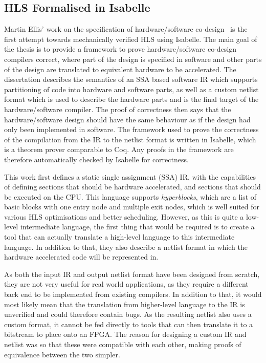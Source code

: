 \subsection{HLS Formalised in Isabelle}

Martin Ellis' work on the specification of hardware/software
co-design~\cite{ellis08_csicgfu} is the first attempt towards mechanically
verified \gls{HLS} using Isabelle.  The main goal of the thesis is to provide a
framework to prove hardware/software co-design compilers correct, where part of
the design is specified in software and other parts of the design are translated
to equivalent hardware to be accelerated.  The dissertation describes the
semantics of an \gls{SSA} based software \gls{IR} which supports partitioning of
code into hardware and software parts, as well as a custom netlist format which
is used to describe the hardware parts and is the final target of the
hardware/software compiler.  The proof of correctness then says that the
hardware/software design should have the same behaviour as if the design had
only been implemented in software.  The framework used to prove the correctness
of the compilation from the IR to the netlist format is written in Isabelle,
which is a theorem prover comparable to Coq.  Any proofs in the framework are
therefore automatically checked by Isabelle for correctness.

This work first defines a static single assignment (SSA) IR, with the
capabilities of defining sections that should be hardware accelerated, and
sections that should be executed on the CPU.  This language supports
\emph{hyperblocks}, which are a list of basic blocks with one entry node and
multiple exit nodes, which is well suited for various HLS optimisations and
better scheduling.  However, as this is quite a low-level intermediate language,
the first thing that would be required is to create a tool that can actually
translate a high-level language to this intermediate language.  In addition to
that, they also describe a netlist format in which the hardware accelerated code
will be represented in.

As both the input IR and output netlist format have been designed from scratch,
they are not very useful for real world applications, as they require a
different back end to be implemented from existing compilers.  In addition to
that, it would most likely mean that the translation from higher-level language
to the IR is unverified and could therefore contain bugs.  As the resulting
netlist also uses a custom format, it cannot be fed directly to tools that can
then translate it to a bitstream to place onto an \gls{FPGA}. The reason for
designing a custom IR and netlist was so that these were compatible with each
other, making proofs of equivalence between the two simpler.

